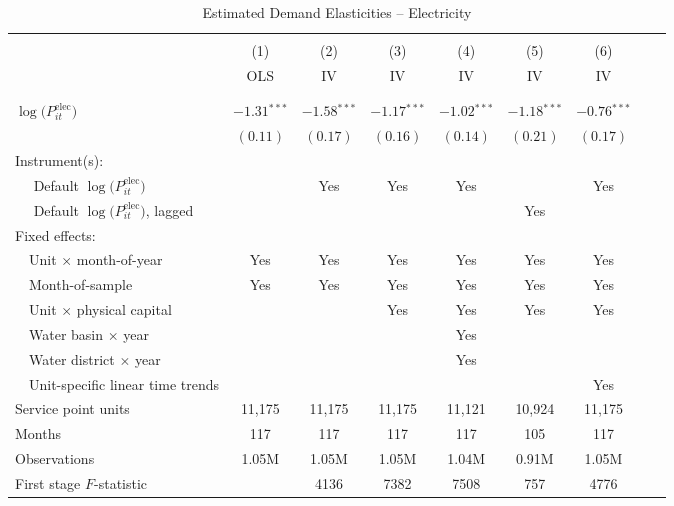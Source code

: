 \begin{table}[t!]\centering
\small
\caption{Estimated Demand Elasticities -- Electricity  \label{tab:elec_regs_main}}
\vspace{-0.1cm}
\small
\begin{adjustbox}{center} 
\begin{tabular}{lcccccccc} 
\hline \hline
\vspace{-0.37cm}
\\
 & (1)  & (2)  & (3)  & (4)  & (5)  & (6) \\ 
[0.1em]
 & OLS & IV & IV & IV & IV & IV \\
\vspace{-0.37cm}
\\
\cline{2-7}
\vspace{-0.27cm}
\\
 $\log\big(P^{\text{elec}}_{it}\big)$ ~ & $-1.31$$^{***}$  & $-1.58$$^{***}$ & $-1.17$$^{***}$ & $-1.02$$^{***}$ & $-1.18$$^{***}$  & $-0.76$$^{***}$ \\ 
& $(0.11)$ & $(0.17)$ & $(0.16)$ & $(0.14)$ & $(0.21)$ & $(0.17)$ \\
[1.5em] 
Instrument(s): \\
[0.1em] 
~~ Default $\log\big(P^{\text{elec}}_{it}\big)$  & & Yes & Yes  & Yes  & & Yes \\
[0.1em] 
~~ Default $\log\big(P^{\text{elec}}_{it}\big)$, lagged  & & & & & Yes & \\
[1.5em] 
Fixed effects: \\
[0.1em] 
~~Unit $\times$ month-of-year  & Yes  & Yes  & Yes  & Yes  & Yes  & Yes   \\ 
[0.1em] 
~~Month-of-sample  & Yes  & Yes  & Yes  & Yes  & Yes  & Yes   \\ 
[0.1em] 
~~Unit $\times$ physical capital & & & Yes & Yes & Yes & Yes  \\
[0.1em] 
~~Water basin $\times$ year & & &  & Yes &  &   \\
[0.1em] 
~~Water district $\times$ year & & &  & Yes &  &  \\
[0.1em] 
~~Unit-specific linear time trends & & & & & &  Yes \\
[1.5em] 
Service point units & 11,175 & 11,175 & 11,175 & 11,121 & 10,924 & 11,175  \\ 
[0.1em] 
Months  & 117 & 117 & 117 & 117 & 105 & 117 \\ 
[0.1em] 
Observations & 1.05M & 1.05M & 1.05M & 1.04M & 0.91M & 1.05M \\ 
[0.1em] 
First stage $F$-statistic &  & 4136 & 7382 & 7508 & 757 & 4776 \\ 

\end{tabular}
\end{adjustbox}
\end{table}

